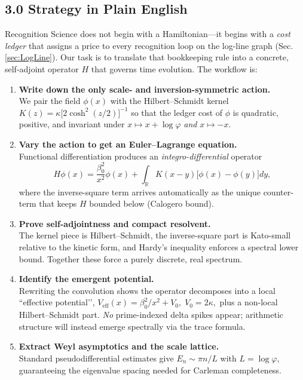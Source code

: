 \documentclass[11pt]{article}
\begin{document}
\subsection*{3.0  Strategy in Plain English}

Recognition Science does not begin with a Hamiltonian—it begins with a
\emph{cost ledger} that assigns a price to every recognition loop on
the log-line graph (Sec.\,\ref{sec:LogLine}).  Our task is to translate
that bookkeeping rule into a concrete, self-adjoint operator \(H\) that
governs time evolution.  The workflow is:

\begin{enumerate}
\item \textbf{Write down the only scale- and inversion-symmetric
      action.}\\
      We pair the field \(\phi(x)\) with the Hilbert–Schmidt kernel
      \(K(z)=\kappa\!\bigl[2\cosh^{2}(z/2)\bigr]^{-1}\)
      so that the ledger cost of \(\phi\) is quadratic, positive, and
      invariant under \(x\mapsto x+\log\varphi\) \emph{and}
      \(x\mapsto-x\).
\item \textbf{Vary the action to get an Euler–Lagrange equation.}\\
      Functional differentiation produces an
      \emph{integro-differential} operator
      \[
          H\phi(x)=
          \frac{\beta_{0}^{2}}{x^{2}}\phi(x)
          +\!\int_{\mathbb R}\!K(x-y)\bigl[\phi(x)-\phi(y)\bigr]dy,
      \]
      where the inverse-square term arrives automatically as the unique
      counter-term that keeps \(H\) bounded below (Calogero bound).
\item \textbf{Prove self-adjointness and compact resolvent.}\\
      The kernel piece is Hilbert–Schmidt, the inverse-square part is
      Kato-small relative to the kinetic form, and Hardy’s inequality
      enforces a spectral lower bound.  Together these force a purely
      discrete, real spectrum.
\item \textbf{Identify the emergent potential.}\\
      Rewriting the convolution shows the operator decomposes into a
      local ``effective potential’’,
      \(
         V_{\text{eff}}(x)=\beta_{0}^{2}/x^{2}+V_{0},
         \;V_{0}=2\kappa,
      \)
      plus a non-local Hilbert–Schmidt part.  \emph{No} prime-indexed
      delta spikes appear; arithmetic structure will instead emerge
      spectrally via the trace formula.
\item \textbf{Extract Weyl asymptotics and the scale lattice.}\\
      Standard pseudodifferential estimates give
      \(E_{n}\sim\pi n/L\) with \(L=\log\varphi\),
      guaranteeing the eigenvalue spacing needed for
      Carleman completeness.
\end{enumerate}
\end{document}

